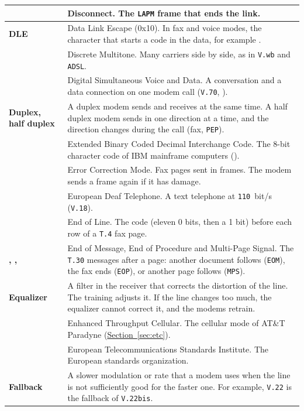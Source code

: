 \documentclass[a5paper,10pt]{article}
\makeatletter
\newcommand{\cmd}[1]{\texttt{#1}}
\newcommand{\std}[1]{\texttt{#1}}
\newcommand{\stdb}[1]{\textpdfrender{TextRenderingMode=FillStroke,
  LineWidth=0.25pt}{\texttt{#1}}}
\newcommand{\cmdl}[2][]{\hyperlink{cmd:#1}{\cmd{#2}}}
\let\cmd\@firstofone
\makeatother
\begin{document}
{\begin{longtable}{|>{\raggedright\arraybackslash}p{}|>{\raggedright\arraybackslash}p{}|}
\textbf{\stdb{DISC}} & Disconnect.  The \std{LAPM} frame that ends the link. \\ \hline
\textbf{DLE} & Data Link Escape (0x10).  In fax and voice modes, the character that starts a code in the data, for example \cmd{<DLE><ETX>}. \\ \hline
\textbf{\stdb{DMT}} & Discrete Multitone.  Many carriers side by side, as in \std{V.wb} and \std{ADSL}. \\ \hline
\textbf{\stdb{DSVD}} & Digital Simultaneous Voice and Data.  A conversation and a data connection on one modem call (\std{V.70}, \cmdl[plusDSVD]{+DSVD}). \\ \hline
\textbf{Duplex, half duplex} & A duplex modem sends and receives at the same time.  A half duplex modem sends in one direction at a time, and the direction changes during the call (fax, \std{PEP}). \\ \hline
\textbf{\stdb{EBCDIC}} & Extended Binary Coded Decimal Interchange Code.  The 8-bit character code of IBM mainframe computers (\cmdl[plusDEBC]{+DEBC}). \\ \hline
\textbf{\stdb{ECM}} & Error Correction Mode.  Fax pages sent in frames.  The modem sends a frame again if it has damage. \\ \hline
\textbf{\stdb{EDT}} & European Deaf Telephone.  A text telephone at \std{110}~bit/s (\std{V.18}). \\ \hline
\textbf{\stdb{EOL}} & End of Line.  The code (eleven 0 bits, then a 1 bit) before each row of a \std{T.4} fax page. \\ \hline
\textbf{\stdb{EOM}, \stdb{EOP}, \stdb{MPS}} & End of Message, End of Procedure and Multi-Page Signal.  The \std{T.30} messages after a page: another document follows (\std{EOM}), the fax ends (\std{EOP}), or another page follows (\std{MPS}). \\ \hline
\textbf{Equalizer} & A filter in the receiver that corrects the distortion of the line.  The training adjusts it.  If the line changes too much, the equalizer cannot correct it, and the modems retrain. \\ \hline
\textbf{\stdb{ETC}} & Enhanced Throughput Cellular.  The cellular mode of AT\&T Paradyne (\hyperref[sec:etc]{Section~\ref*{sec:etc}}). \\ \hline
\textbf{\stdb{ETSI}} & European Telecommunications Standards Institute.  The European standards organization. \\ \hline
\textbf{Fallback} & A slower modulation or rate that a modem uses when the line is not sufficiently good for the faster one.  For example, \std{V.22} is the fallback of \std{V.22bis}. \\ \hline

\end{longtable}}
\end{document}
